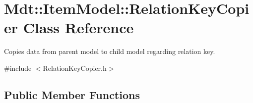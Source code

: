 \hypertarget{class_mdt_1_1_item_model_1_1_relation_key_copier}{}\section{Mdt\+:\+:Item\+Model\+:\+:Relation\+Key\+Copier Class Reference}
\label{class_mdt_1_1_item_model_1_1_relation_key_copier}


Copies data from parent model to child model regarding relation key.  




{\ttfamily \#include $<$Relation\+Key\+Copier.\+h$>$}

\subsection*{Public Member Functions}
